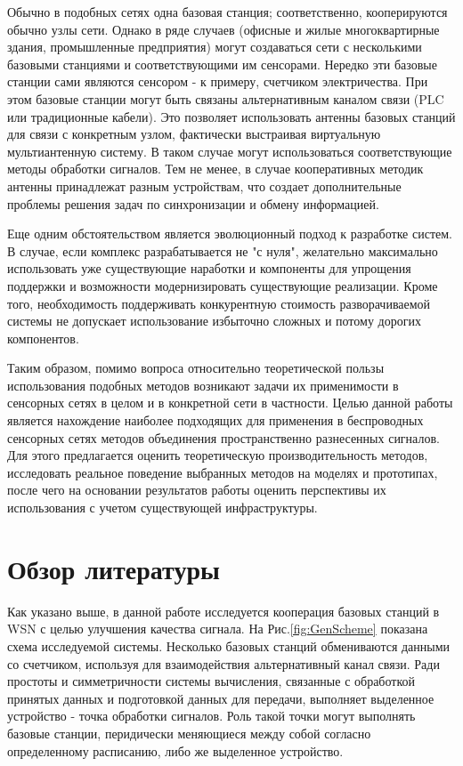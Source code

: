 \documentclass[a4paper,12pt,oneside]{scrartcl}
\begin{document}
Обычно в подобных сетях одна базовая станция; соответственно, кооперируются обычно узлы сети. 
Однако в ряде случаев (офисные и жилые многоквартирные здания, промышленные предприятия) могут создаваться сети с несколькими базовыми станциями и соответствующими им сенсорами. 
Нередко эти базовые станции сами являются сенсором - к примеру, счетчиком электричества. 
При этом базовые станции могут быть связаны альтернативным каналом связи (PLC или традиционные кабели). 
Это позволяет использовать антенны базовых станций для связи с конкретным узлом, фактически выстраивая виртуальную мультиантенную систему. 
В таком случае могут использоваться соответствующие методы обработки сигналов. 
Тем не менее, в случае кооперативных методик антенны принадлежат разным устройствам, что создает дополнительные проблемы решения задач по синхронизации и обмену информацией. 

Еще одним обстоятельством является эволюционный подход к разработке систем. 
В случае, если комплекс разрабатывается не "с нуля", желательно максимально использовать уже существующие наработки и компоненты для упрощения поддержки и возможности модернизировать существующие реализации. 
Кроме того, необходимость поддерживать конкурентную стоимость разворачиваемой системы не допускает использование избыточно сложных и потому дорогих компонентов.

Таким образом, помимо вопроса относительно теоретической пользы использования подобных методов возникают задачи их применимости в сенсорных сетях в целом и в конкретной сети в частности.
Целью данной работы является нахождение наиболее подходящих для применения в беспроводных сенсорных сетях методов объединения пространственно разнесенных сигналов.
Для этого предлагается оценить теоретическую производительность методов, исследовать реальное поведение выбранных методов на моделях и прототипах, после чего на основании результатов работы оценить перспективы их использования с учетом существующей инфраструктуры.
\clearpage

\section{Обзор литературы}

Как указано выше, в данной работе исследуется кооперация базовых станций в WSN с целью улучшения качества сигнала.
На Рис.\ref{fig:GenScheme} показана схема исследуемой системы. 
Несколько базовых станций обмениваются данными со счетчиком, используя для взаимодействия альтернативный канал связи. 
Ради простоты и симметричности системы вычисления, связанные с обработкой принятых данных и подготовкой данных для передачи, выполняет выделенное устройство - точка обработки сигналов. 
Роль такой точки могут выполнять базовые станции, перидически меняющиеся между собой согласно определенному расписанию, либо же выделенное устройство.
\end{document}
